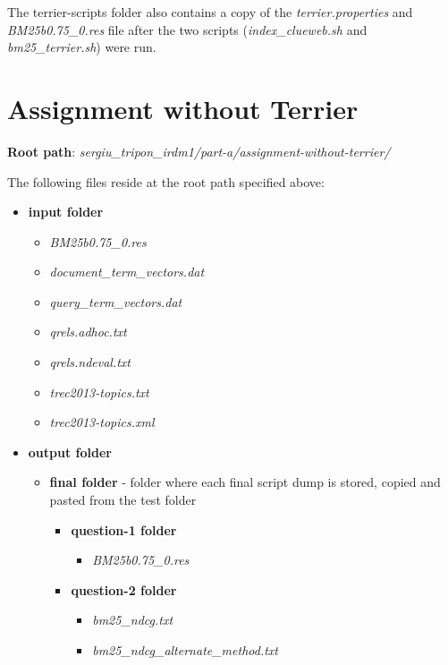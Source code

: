 \documentclass{article} %
\begin{document}
The terrier-scripts folder also contains a copy of the \textit{terrier.properties} and \textit{BM25b0.75\_0.res} file after the two scripts (\textit{index\_clueweb.sh} and \textit{bm25\_terrier.sh}) were run.

\section*{Assignment without Terrier}

\textbf{Root path}: \textit{sergiu\_tripon\_irdm1/part-a/assignment-without-terrier/}

The following files reside at the root path specified above:

\begin{itemize}
    \item \textbf{input folder}
    \begin{itemize}
        \item \textit{BM25b0.75\_0.res}
        \item \textit{document\_term\_vectors.dat}
        \item \textit{query\_term\_vectors.dat}
        \item \textit{qrels.adhoc.txt}
        \item \textit{qrels.ndeval.txt}
        \item \textit{trec2013-topics.txt}
        \item \textit{trec2013-topics.xml}
    \end{itemize}
    \item \textbf{output folder}
    \begin{itemize}
        \item \textbf{final folder} - folder where each final script dump is stored, copied and pasted from the test folder
        \begin{itemize}
            \item \textbf{question-1 folder}
            \begin{itemize}
                \item \textit{BM25b0.75\_0.res}
            \end{itemize}
            \item \textbf{question-2 folder}
            \begin{itemize}
                \item \textit{bm25\_ndcg.txt}
                \item \textit{bm25\_ndcg\_alternate\_method.txt}
            \end{itemize}

\end{itemize}
\end{itemize}
\end{itemize}
\end{document}
